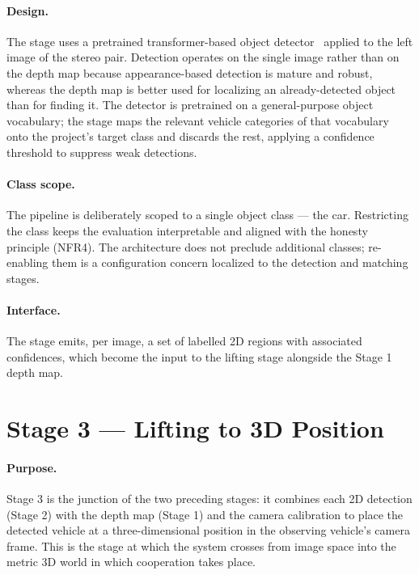 \paragraph{Design.} The stage uses a pretrained transformer-based object
detector~\cite{lv2024} applied to the left image of the stereo pair. Detection
operates on the single image rather than on the depth map because appearance-based
detection is mature and robust, whereas the depth map is better used for
localizing an already-detected object than for finding it. The
detector is pretrained on a general-purpose object vocabulary; the stage maps the
relevant vehicle categories of that vocabulary onto the project's target class and
discards the rest, applying a confidence threshold to suppress weak detections.

\paragraph{Class scope.} The pipeline is deliberately scoped to a single object
class --- the car. Restricting the class keeps the evaluation interpretable and aligned
with the honesty principle (NFR4). The architecture does not preclude additional
classes; re-enabling them is a configuration concern localized to the detection and
matching stages.

\paragraph{Interface.} The stage emits, per image, a set of labelled 2D regions
with associated confidences, which become the input to the lifting stage alongside
the Stage 1 depth map.

\section{Stage 3 --- Lifting to 3D Position}
\label{sec:stage3}

\paragraph{Purpose.} Stage 3 is the junction of the two preceding stages: it
combines each 2D detection (Stage 2) with the depth map (Stage 1) and the camera
calibration to place the detected vehicle at a three-dimensional position in the
observing vehicle's camera frame. This is the stage at which the system crosses
from image space into the metric 3D world in which cooperation takes place.

